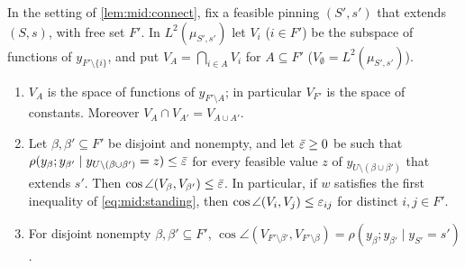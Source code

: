 \begin{lemma}\label{lem:mid:subspaces}
In the setting of \cref{lem:mid:connect}, fix a feasible pinning $(S',s')$ that
extends $(S,s)$, with free set $F'$. In $L^2(\mu_{S',s'})$ let $V_i$ ($i\in F'$)
be the subspace of functions of $y_{F'\setminus\{i\}}$, and put
$V_A=\bigcap_{i\in A}V_i$ for $A\subseteq F'$ ($V_\emptyset=L^2(\mu_{S',s'})$).
\begin{enumerate}[label=\textup{(\roman*)}]
\item $V_A$ is the space of functions of $y_{F'\setminus A}$; in particular
  $V_{F'}$ is the space of constants. Moreover $V_A\cap V_{A'}=V_{A\cup A'}$.
\item Let $\beta,\beta'\subseteq F'$ be disjoint and nonempty, and let
  $\bar{\varepsilon}\ge0$ be such that
  $\rho(y_\beta;y_{\beta'}\mid y_{U\setminus(\beta\cup\beta')}=z)\le\bar{\varepsilon}$ for every
  feasible value $z$ of $y_{U\setminus(\beta\cup\beta')}$ that extends $s'$.
  Then $\cos\angle(V_\beta,V_{\beta'})\le\bar{\varepsilon}$. In particular, if $w$
  satisfies the first inequality of \eqref{eq:mid:standing}, then
  $\cos\angle(V_i,V_j)\le\varepsilon_{ij}$ for distinct $i,j\in F'$.
\item For disjoint nonempty $\beta,\beta'\subseteq F'$,
  $\cos\angle(V_{F'\setminus\beta'},V_{F'\setminus\beta})=\rho(y_\beta;y_{\beta'}\mid
  y_{S'}=s')$.
\end{enumerate}
\end{lemma}

